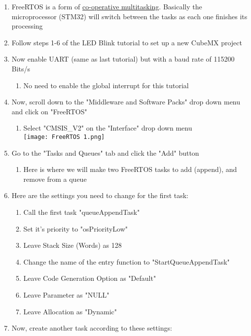 \begin{enumerate}
    \item FreeRTOS is a form of \href{https://en.wikipedia.org/wiki/Cooperative_multitasking}{co-operative multitasking}. Basically the microprocessor (STM32) will switch between the tasks as each one finishes its processing
    \item Follow steps 1-6 of the LED Blink tutorial to set up a new CubeMX project
    \item Now enable UART (same as last tutorial) but with a baud rate of 115200 Bits/s
    \begin{enumerate}
        \item No need to enable the global interrupt for this tutorial
    \end{enumerate}
    \item Now, scroll down to the "Middleware and Software Packs" drop down menu and click on "FreeRTOS"
    \begin{enumerate}
        \item Select "CMSIS\_V2" on the "Interface" drop down menu \vspace{0.25cm}\\\texttt{[image: FreeRTOS 1.png]}
    \end{enumerate}
    \item Go to the "Tasks and Queues" tab and click the "Add" button
    \begin{enumerate}
        \item Here is where we will make two FreeRTOS tasks to add (append), and remove from a queue
    \end{enumerate}
    \item Here are the settings you need to change for the first task:
    \begin{enumerate}
        \item Call the first task "queueAppendTask"
        \item Set it's priority to "osPriorityLow"
        \item Leave Stack Size (Words) as 128
        \item Change the name of the entry function to "StartQueueAppendTask"
        \item Leave Code Generation Option as "Default"
        \item Leave Parameter as "NULL"
        \item Leave Allocation as "Dynamic"
    \end{enumerate}
    \item Now, create another task according to these settings:

\end{enumerate}
